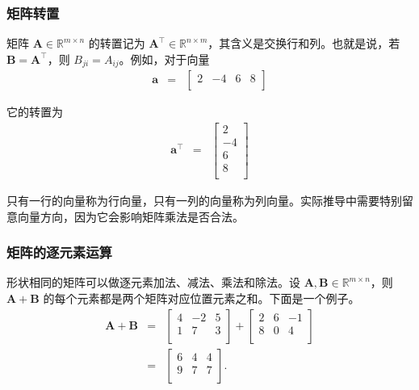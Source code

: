 \subsubsection{矩阵转置}

\noindent 矩阵 $\mathbf{A}\in\mathbb{R}^{m\times n}$ 的转置记为 $\mathbf{A}^\top\in\mathbb{R}^{n\times m}$，其含义是交换行和列。也就是说，若 $\mathbf{B}=\mathbf{A}^\top$，则 $B_{ji}=A_{ij}$。例如，对于向量
\begin{eqnarray}
\mathbf{a} & = &
\begin{bmatrix}
2 & -4 & 6 & 8 \\
\end{bmatrix}
\label{eq:row-vector-example}
\end{eqnarray}

\noindent 它的转置为
\begin{eqnarray}
\mathbf{a}^\top & = &
\begin{bmatrix}
2 \\
-4 \\
6 \\
8 \\
\end{bmatrix}
\label{eq:col-vector-example}
\end{eqnarray}

只有一行的向量称为行向量，只有一列的向量称为列向量。实际推导中需要特别留意向量方向，因为它会影响矩阵乘法是否合法。

\subsubsection{矩阵的逐元素运算}

\noindent 形状相同的矩阵可以做逐元素加法、减法、乘法和除法。设 $\mathbf{A},\mathbf{B}\in\mathbb{R}^{m\times n}$，则 $\mathbf{A}+\mathbf{B}$ 的每个元素都是两个矩阵对应位置元素之和。下面是一个例子。
\begin{eqnarray}
\mathbf{A} + \mathbf{B} & = &
\begin{bmatrix}
4 & -2 & 5 \\
1 & 7 & 3 \\
\end{bmatrix}
+
\begin{bmatrix}
2 & 6 & -1 \\
8 & 0 & 4 \\
\end{bmatrix}
\nonumber \\
& = &
\begin{bmatrix}
6 & 4 & 4 \\
9 & 7 & 7 \\
\end{bmatrix}.
\end{eqnarray}

